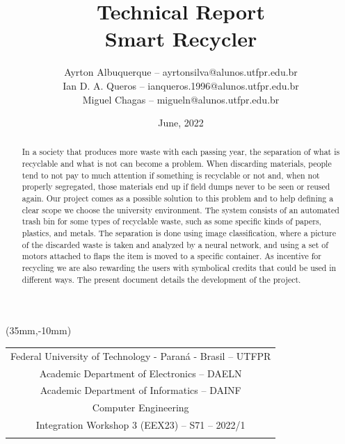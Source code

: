 \documentclass[a4paper,11pt]{article}
\title{
Technical Report\\
\textbf{Smart Recycler}}
\author{
Ayrton Albuquerque \footnotesize{-- ayrtonsilva@alunos.utfpr.edu.br}\\
Ian D. A. Queros \footnotesize{-- ianqueros.1996@alunos.utfpr.edu.br}\\
Miguel Chagas \footnotesize{-- migueln@alunos.utfpr.edu.br}\\
}
\date{June, 2022}
\begin{document}
\thisfancyput(35mm,-10mm){
  \begin{tabular}{c}
    Federal University of Technology - Paraná - Brasil -- \small{UTFPR} \\
    Academic Department of Electronics -- \small{DAELN}                 \\
    Academic Department of Informatics -- \small{DAINF}                 \\
    Computer Engineering                                                \\
    Integration Workshop 3 (EEX23) -- S71 -- 2022/1                     \\
    \\
    \hline
  \end{tabular}}

\maketitle

\begin{abstract}
  \noindent In a society that produces more waste with each passing year, the separation of what is recyclable and what is not can become a problem. When discarding materials, people tend to not pay to much attention if something is recyclable or not and, when not properly segregated, those materials end up if field dumps never to be seen or reused again. Our project comes as a possible solution to this problem and to help defining a clear scope we choose the university environment. The system consists of an automated trash bin for some types of recyclable waste, such as some specific kinds of papers, plastics, and metals. The separation is done using image classification, where a picture of the discarded waste is taken and analyzed by a neural network, and using a set of motors attached to flaps the item is moved to a specific container. As incentive for recycling we are also rewarding the users with symbolical credits that could be used in different ways. The present document details the development of the project.
\end{abstract}

\end{document}
